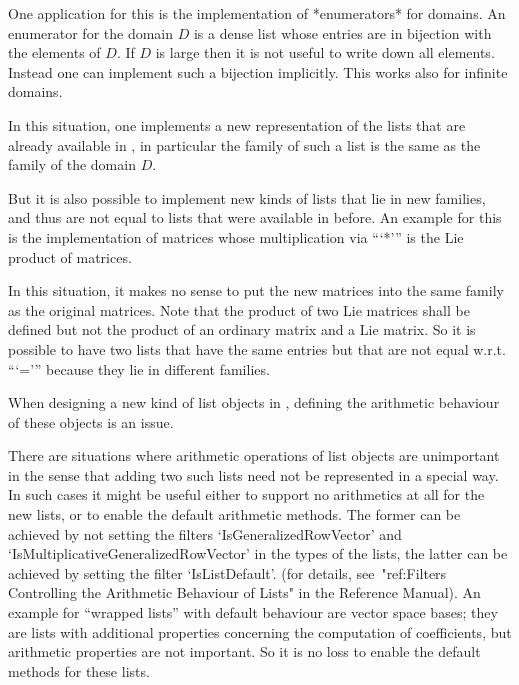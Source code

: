 One application for this is the implementation of *enumerators*
for domains.
An enumerator for the domain $D$ is a dense list whose entries are
in bijection with the elements of $D$.
If $D$ is large then it is not useful to write down all elements.
Instead one can implement such a bijection implicitly.
This works also for infinite domains.

In this situation, one implements a new representation of the
lists that are already available in {\GAP},
in particular the family of such a list is the same as the family of
the domain $D$.

But it is also possible to implement new kinds of lists that lie in
new families, and thus are not equal to lists that were available
in {\GAP} before.
An example for this is the implementation of matrices
whose multiplication via ```*''' is the Lie product of matrices.

In this situation, it makes no sense to put the new matrices into the
same family as the original matrices.
Note that the product of two Lie matrices shall be defined but not the
product of an ordinary matrix and a Lie matrix.
So it is possible to have two lists that have the same entries but that
are not equal w.r.t. ```=''' because they lie in different families.



When designing a new kind of list objects in {\GAP},
defining the arithmetic behaviour of these objects is an issue.

There are situations where arithmetic operations of list objects
are unimportant in the sense that adding two such lists need not be
represented in a special way.
In such cases it might be useful either to support no arithmetics at all
for the new lists, or to enable the default arithmetic methods.
The former can be achieved by not setting the filters
`IsGeneralizedRowVector' and `IsMultiplicativeGeneralizedRowVector'
in the types of the lists,
the latter can be achieved by setting the filter `IsListDefault'.
(for details, see~"ref:Filters Controlling the Arithmetic Behaviour of Lists"
in the {\GAP} Reference Manual).
An example for ``wrapped lists'' with default behaviour are vector space
bases;
they are lists with additional properties concerning the computation of
coefficients, but arithmetic properties are not important.
So it is no loss to enable the default methods for these lists.


